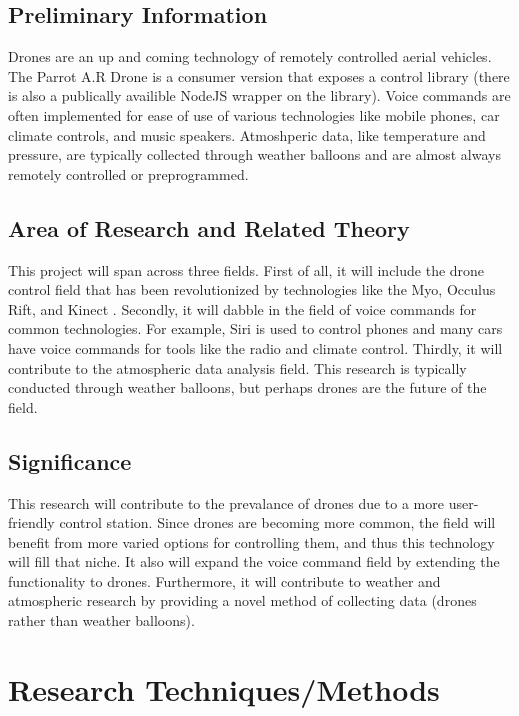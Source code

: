 \documentclass{article}
\begin{document}
	\subsection{Preliminary Information}
	Drones are an up and coming technology of remotely controlled aerial vehicles. The Parrot A.R Drone is a consumer version that exposes a control library (there is also a publically availible NodeJS wrapper on the library). Voice commands are often implemented for ease of use of various technologies like mobile phones, car climate controls, and music speakers. Atmoshperic data, like temperature and pressure, are typically collected through weather balloons and are almost always remotely controlled or preprogrammed. 
	\subsection{Area of Research and Related Theory}
	This project will span across three fields. First of all, it will include the drone control field that has been revolutionized by technologies like the Myo, Occulus Rift, and Kinect \cite{kinect}. Secondly, it will dabble in the field of voice commands for common technologies. For example, Siri is used to control phones and many cars have voice commands for tools like the radio and climate control. Thirdly, it will contribute to the atmospheric data analysis field. This research is typically conducted through weather balloons, but perhaps drones are the future of the field. 
	\subsection{Significance}
	This research will contribute to the prevalance of drones due to a more user-friendly control station. Since drones are becoming more common, the field will benefit from more varied options for controlling them, and thus this technology will fill that niche. It also will expand the voice command field by extending the functionality to drones. Furthermore, it will contribute to weather and atmospheric research by providing a novel method of collecting data (drones rather than weather balloons). 


	\section{Research Techniques/Methods}
\end{document}
